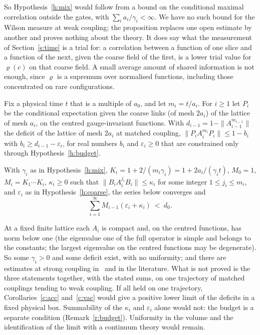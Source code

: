 So Hypothesis~\ref{h:mix} would follow from a bound on the conditional maximal correlation outside the gates,
with $\sum_ia_i/\gamma_i<\infty$. We have no such bound for the Wilson measure at weak coupling; the
proposition replaces one open estimate by another and proves nothing about the theory. It does say what the
measurement of Section~\ref{s:time} is a trial for: a correlation between a function of one slice and a
function of the next, given the coarse field of the first, is a lower trial value for $\varrho(c)$ on that
coarse field. A small average amount of shared information is not enough, since $\varrho$ is a supremum over
normalised functions, including those concentrated on rare configurations.

\begin{hypothesis}\label{h:coarse}
Fix a physical time $t$ that is a multiple of $a_0$, and let $m_i=t/a_i$. For $i\ge1$ let $P_i$ be the conditional
expectation given the coarse links (of mesh $2a_i$) of the lattice of mesh $a_i$, on the centred gauge-invariant functions. With $d_{i-1}=1-\|A_{i-1}^{m_{i-1}}\|$
the deficit of the lattice of mesh $2a_i$ at matched coupling, $\|P_iA_i^{m_i}P_i\|\le1-b_i$ with
$b_i\ge d_{i-1}-\varepsilon_i$, for real numbers $b_i$ and $\varepsilon_i\ge0$ that are constrained only through
Hypothesis~\ref{h:budget}.
\end{hypothesis}

\begin{hypothesis}\label{h:budget}
With $\gamma_i$ as in Hypothesis~\ref{h:mix}, $K_i=1+2/(m_i\gamma_i)=1+2a_i/(\gamma_it)$, $M_0=1$, $M_i=K_1\cdots K_i$, $\kappa_i\ge0$ such
that $\|B_iA_i^{j_i}B_i\|\le\kappa_i$ for some integer $1\le j_i\le m_i$, and $\varepsilon_i$ as in
Hypothesis~\ref{h:coarse}, the series below converges and
\[
\sum_{i=1}^\infty M_{i-1}(\varepsilon_i+\kappa_i)\ <\ d_0 .
\]
\end{hypothesis}

At a fixed finite lattice each $A_i$ is compact and, on the centred functions, has norm below one (the eigenvalue
one of the full operator is simple and belongs to the constants; the largest eigenvalue on the centred
functions may be degenerate). So some $\gamma_i>0$ and some deficit exist, with no uniformity; and there are estimates at strong coupling in~\cite{RepoInh} and in the literature. What is
not proved is the three statements together, with the stated sums, on one trajectory of matched couplings
tending to weak coupling. If all held on one trajectory, Corollaries~\ref{c:acc} and~\ref{c:vac} would give a positive lower limit of the deficits in a
fixed physical box. Summability of the $\kappa_i$ and $\varepsilon_i$ alone would not: the budget is a
separate condition (Remark~\ref{r:budget}). Uniformity in the volume and the identification of the limit with
a continuum theory would remain.


